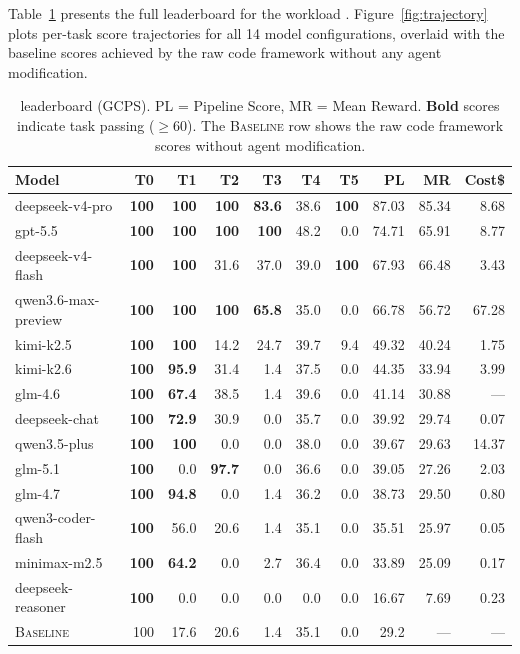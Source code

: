 Table~\ref{tab:main} presents the full \eva{} leaderboard for the \Progressive{} workload .
Figure~\ref{fig:trajectory} plots per-task score trajectories for all 14 model configurations, overlaid with the baseline scores achieved by the raw code framework without any agent modification.

\begin{table}[!t]
\centering
\caption{\eva{} \Progressive{} leaderboard (GCPS). PL = Pipeline Score, MR = Mean Reward. \textbf{Bold} scores indicate task passing ($\geq 60$). The \textsc{Baseline} row shows the raw code framework scores without agent modification.}
\small
\begin{tabular}{lrrrrrrrrr}
\toprule
\textbf{Model} & \textbf{T0} & \textbf{T1} & \textbf{T2} & \textbf{T3} & \textbf{T4} & \textbf{T5} & \textbf{PL} & \textbf{MR} & \textbf{Cost\$} \\
\midrule
deepseek-v4-pro & \textbf{100} & \textbf{100} & \textbf{100} & \textbf{83.6} & 38.6 & \textbf{100} & 87.03 & 85.34 & 8.68 \\
gpt-5.5 & \textbf{100} & \textbf{100} & \textbf{100} & \textbf{100} & 48.2 & 0.0 & 74.71 & 65.91 & 8.77 \\
deepseek-v4-flash & \textbf{100} & \textbf{100} & 31.6 & 37.0 & 39.0 & \textbf{100} & 67.93 & 66.48 & 3.43 \\
qwen3.6-max-preview & \textbf{100} & \textbf{100} & \textbf{100} & \textbf{65.8} & 35.0 & 0.0 & 66.78 & 56.72 & 67.28 \\
kimi-k2.5 & \textbf{100} & \textbf{100} & 14.2 & 24.7 & 39.7 & 9.4 & 49.32 & 40.24 & 1.75 \\

kimi-k2.6 & \textbf{100} & \textbf{95.9} & 31.4 & 1.4 & 37.5 & 0.0 & 44.35 & 33.94 & 3.99 \\

glm-4.6 & \textbf{100} & \textbf{67.4} & 38.5 & 1.4 & 39.6 & 0.0 & 41.14 & 30.88 & --- \\
deepseek-chat & \textbf{100} & \textbf{72.9} & 30.9 & 0.0 & 35.7 & 0.0 & 39.92 & 29.74 & 0.07 \\
qwen3.5-plus & \textbf{100} & \textbf{100} & 0.0 & 0.0 & 38.0 & 0.0 & 39.67 & 29.63 & 14.37 \\
glm-5.1 & \textbf{100} & 0.0 & \textbf{97.7} & 0.0 & 36.6 & 0.0 & 39.05 & 27.26 & 2.03 \\
glm-4.7 & \textbf{100} & \textbf{94.8} & 0.0 & 1.4 & 36.2 & 0.0 & 38.73 & 29.50 & 0.80 \\

qwen3-coder-flash & \textbf{100} & 56.0 & 20.6 & 1.4 & 35.1 & 0.0 & 35.51 & 25.97 & 0.05 \\
minimax-m2.5 & \textbf{100} & \textbf{64.2} & 0.0 & 2.7 & 36.4 & 0.0 & 33.89 & 25.09 & 0.17 \\

deepseek-reasoner & \textbf{100} & 0.0 & 0.0 & 0.0 & 0.0 & 0.0 & 16.67 & 7.69 & 0.23 \\
\midrule
\textsc{Baseline} & 100 & 17.6 & 20.6 & 1.4 & 35.1 & 0.0 & 29.2 & --- & --- \\
\end{tabular}
\label{tab:main}
\end{table}

